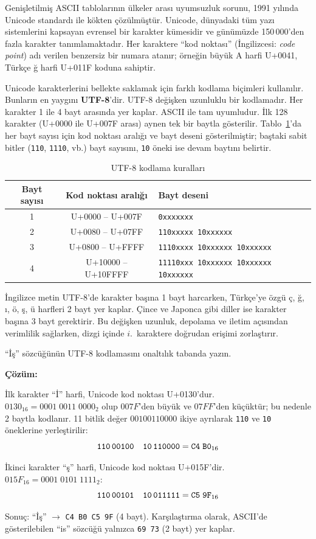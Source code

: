 Genişletilmiş ASCII tablolarının ülkeler arası uyumsuzluk sorunu, 1991 yılında Unicode standardı ile kökten çözülmüştür. Unicode, dünyadaki tüm yazı sistemlerini kapsayan evrensel bir karakter kümesidir ve günümüzde 150\,000'den fazla karakter tanımlamaktadır. Her karaktere ``kod noktası'' (İngilizcesi: \textit{code point}) adı verilen benzersiz bir numara atanır; örneğin büyük A harfi U+0041, Türkçe ğ harfi U+011F koduna sahiptir.

Unicode karakterlerini bellekte saklamak için farklı kodlama biçimleri kullanılır. Bunların en yaygını \textbf{UTF-8}'dir. UTF-8 değişken uzunluklu bir kodlamadır. Her karakter 1 ile 4 bayt arasında yer kaplar. ASCII ile tam uyumludur. İlk 128 karakter (U+0000 ile U+007F arası) aynen tek bir baytla gösterilir. Tablo~\ref{tab:utf8-kodlama}'da her bayt sayısı için kod noktası aralığı ve bayt deseni gösterilmiştir; baştaki sabit bitler (\texttt{110}, \texttt{1110}, vb.) bayt sayısını, \texttt{10} öneki ise devam baytını belirtir.

\begin{table}[H]
\centering
\caption{UTF-8 kodlama kuralları}
\label{tab:utf8-kodlama}
\begin{tabular}{ccl}
\toprule
\textbf{Bayt sayısı} & \textbf{Kod noktası aralığı} & \textbf{Bayt deseni} \\
\midrule
1 & U+0000 -- U+007F   & \texttt{0xxxxxxx} \\
2 & U+0080 -- U+07FF   & \texttt{110xxxxx 10xxxxxx} \\
3 & U+0800 -- U+FFFF   & \texttt{1110xxxx 10xxxxxx 10xxxxxx} \\
4 & U+10000 -- U+10FFFF & \texttt{11110xxx 10xxxxxx 10xxxxxx 10xxxxxx} \\
\bottomrule
\end{tabular}
\end{table}

İngilizce metin UTF-8'de karakter başına 1 bayt harcarken, Türkçe'ye özgü ç, ğ, ı, ö, ş, ü harfleri 2 bayt yer kaplar. Çince ve Japonca gibi diller ise karakter başına 3 bayt gerektirir. Bu değişken uzunluk, depolama ve iletim açısından verimlilik sağlarken, dizgi içinde $i$.~karaktere doğrudan erişimi zorlaştırır.

\begin{ornek}[A.23]
``İş'' sözcüğünün UTF-8 kodlamasını onaltılık tabanda yazın.

\textbf{Çözüm:}

İlk karakter ``İ'' harfi, Unicode kod noktası U+0130'dur. $0130_{16} = 0001\;0011\;0000_2$ olup $007F$'den büyük ve $07FF$'den küçüktür; bu nedenle 2 baytla kodlanır. 11 bitlik değer $00100110000$ ikiye ayrılarak \texttt{110} ve \texttt{10} öneklerine yerleştirilir:
\[
\texttt{110\,00100\quad 10\,110000} = \texttt{C4\;B0}_{16}
\]

İkinci karakter ``ş'' harfi, Unicode kod noktası U+015F'dir. $015F_{16} = 0001\;0101\;1111_2$:
\[
\texttt{110\,00101\quad 10\,011111} = \texttt{C5\;9F}_{16}
\]

Sonuç: ``İş'' $\rightarrow$ \texttt{C4 B0 C5 9F} (4 bayt). Karşılaştırma olarak, ASCII'de gösterilebilen ``is'' sözcüğü yalnızca \texttt{69 73} (2 bayt) yer kaplar.
\end{ornek}



